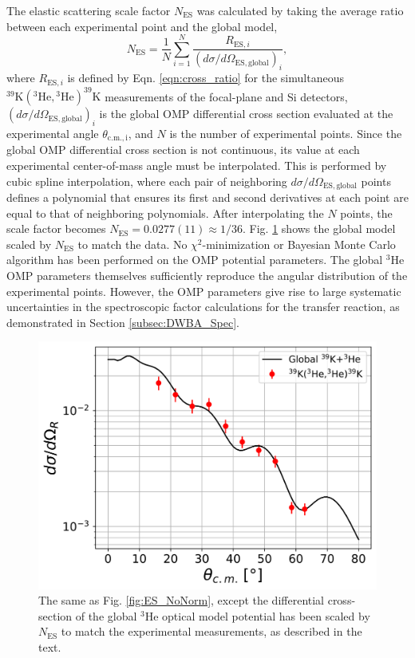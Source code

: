 The elastic scattering scale factor $N_{\mathrm{ES}}$ was calculated by taking the average ratio between each experimental point and the global model,
\begin{equation}
N_{\mathrm{ES}} = \frac{1}{N} \sum_{i=1}^{N} \frac{R_{\mathrm{ES}, i}}{\left( d\sigma/d\Omega_{\mathrm{ES, global}} \right)_{i}},
\end{equation}
where $R_{\mathrm{ES}, i}$ is defined by Eqn. \ref{eqn:cross_ratio} for the simultaneous $^{39}\mathrm{K}(^{3}\mathrm{He}, {}^{3}\mathrm{He})^{39}\mathrm{K}$ measurements of the focal-plane and Si detectors, $\left( d\sigma/d\Omega_{\mathrm{ES, global}} \right)_{i}$ is the global OMP differential cross section evaluated at the experimental angle $\theta_{\mathrm{c.m., i}}$, and $N$ is the number of experimental points. Since the global OMP differential cross section is not continuous, its value at each experimental center-of-mass angle must be interpolated. This is performed by cubic spline interpolation, where each pair of neighboring $d\sigma/d\Omega_{\mathrm{ES, global}}$ points defines a polynomial that ensures its first and second derivatives at each point are equal to that of neighboring polynomials. After interpolating the $N$ points, the scale factor becomes $N_{\mathrm{ES}} = 0.0277(11) \approx 1/36$. Fig. \ref{fig:ES_Norm} shows the global model scaled by $N_{\mathrm{ES}}$ to match the data. No $\chi^{2}$-minimization or Bayesian Monte Carlo algorithm has been performed on the OMP potential parameters. The global $^{3}$He OMP parameters themselves sufficiently reproduce the angular distribution of the experimental points. However, the OMP parameters give rise to large systematic uncertainties in the spectroscopic factor calculations for the transfer reaction, as demonstrated in Section \ref{subsec:DWBA_Spec}.

\begin{figure}[t]
\centering
\includegraphics[width=6.5in]{Chapter-6/figs/global_Norm.png}
\caption{\label{fig:ES_Norm}The same as Fig. \ref{fig:ES_NoNorm}, except the differential cross-section of the global $^{3}$He optical model potential has been scaled by $N_{\mathrm{ES}}$ to match the experimental measurements, as described in the text.}
\end{figure}

